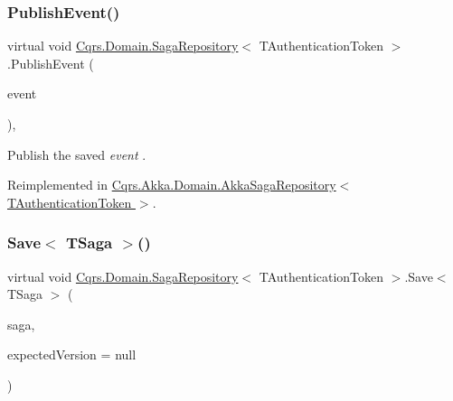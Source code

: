 \subsubsection{\texorpdfstring{Publish\+Event()}{PublishEvent()}}
{\footnotesize\ttfamily virtual void \hyperlink{classCqrs_1_1Domain_1_1SagaRepository}{Cqrs.\+Domain.\+Saga\+Repository}$<$ T\+Authentication\+Token $>$.Publish\+Event (\begin{DoxyParamCaption}\item[{\hyperlink{interfaceCqrs_1_1Events_1_1ISagaEvent}{I\+Saga\+Event}$<$ T\+Authentication\+Token $>$ @}]{event }\end{DoxyParamCaption})\hspace{0.3cm}{\ttfamily [protected]}, {\ttfamily [virtual]}}



Publish the saved {\itshape event} . 



Reimplemented in \hyperlink{classCqrs_1_1Akka_1_1Domain_1_1AkkaSagaRepository_a7f6375bb99e680792466fb420232a535_a7f6375bb99e680792466fb420232a535}{Cqrs.\+Akka.\+Domain.\+Akka\+Saga\+Repository$<$ T\+Authentication\+Token $>$}.

\mbox{\label{classCqrs_1_1Domain_1_1SagaRepository_a84cae424cb01de22864ae7d960007cd0_a84cae424cb01de22864ae7d960007cd0}} 
\subsubsection{\texorpdfstring{Save$<$ T\+Saga $>$()}{Save< TSaga >()}}
{\footnotesize\ttfamily virtual void \hyperlink{classCqrs_1_1Domain_1_1SagaRepository}{Cqrs.\+Domain.\+Saga\+Repository}$<$ T\+Authentication\+Token $>$.Save$<$ T\+Saga $>$ (\begin{DoxyParamCaption}\item[{T\+Saga}]{saga,  }\item[{int?}]{expected\+Version = {\ttfamily null} }\end{DoxyParamCaption})\hspace{0.3cm}{\ttfamily [virtual]}}



